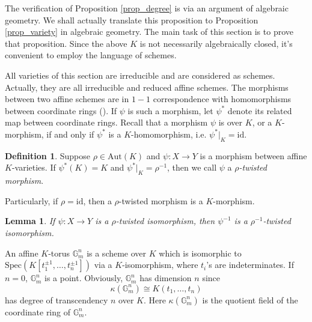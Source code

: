 \documentclass[12pt]{amsart}
\theoremstyle{plain}
\newtheorem{lemma}[theorem]{Lemma}
\theoremstyle{definition}
\newtheorem{definition}[theorem]{Definition}
\theoremstyle{question}
\theoremstyle{remark}
\theoremstyle{assumption}
\numberwithin{equation}{section}
\theoremstyle{bigthm}
\begin{document}
The verification of Proposition \ref{prop_degree} is via an argument of algebraic geometry. We shall actually translate this proposition to Proposition \ref{prop_variety} in algebraic geometry. The main task of this section is to prove that proposition. Since the above $K$ is not necessarily algebraically closed, it's convenient to employ the language of schemes.

All varieties of this section are irreducible and are considered as schemes. Actually, they are all irreducible and reduced affine schemes. The morphisms between two affine schemes are in $1-1$ correspondence with homomorphisms between coordinate rings (\cite[p.~79,~Theorem~1]{Mumford}). If $\psi$ is such a morphism, let $\psi^{*}$ denote its related map between coordinate rings. Recall that a morphism $\psi$ is over $K$, or a $K$-morphism, if and only if $\psi^{*}$ is a $K$-homomorphism, i.e. $\psi^{*}|_{K} = \mathrm{id}$.
\begin{definition}
Suppose $\rho \in \mathrm{Aut} (K)$ and $\psi \colon  X \rightarrow Y$ is a morphism between affine $K$-varieties. If $\psi^{*} (K) = K$ and $\psi^{*}|_{K} = \rho^{-1}$, then we call $\psi$ a \textit{$\rho$-twisted morphism}.
\end{definition}

Particularly, if $\rho = \mathrm{\mathrm{id}}$, then a $\rho$-twisted morphism is a $K$-morphism.

\begin{lemma}
If $\psi \colon  X \rightarrow Y$ is a $\rho$-twisted isomorphism, then $\psi^{-1}$ is a $\rho^{-1}$-twisted isomorphism.
\end{lemma}

An affine $K$-torus $\mathbb{G}_{m}^{n}$ is a scheme over $K$ which is isomorphic to $\mathrm{Spec}(K[t_{1}^{\pm 1}, \dots, t_{n}^{\pm 1}])$ via a $K$-isomorphism, where $t_{i}$'s are indeterminates. If $n=0$, $\mathbb{G}_{m}^{n}$ is a point. Obviously, $\mathbb{G}_{m}^{n}$ has dimension $n$ since
\[
\kappa (\mathbb{G}_{m}^{n}) \cong K(t_{1}, \dots, t_{n})
\]
has degree of transcendency $n$ over $K$. Here $\kappa (\mathbb{G}_{m}^{n})$ is the quotient field of the coordinate ring of $\mathbb{G}_{m}^{n}$.
\end{document}

